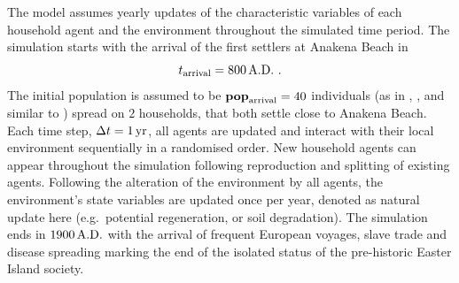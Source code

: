 The model assumes yearly updates of the characteristic variables of each household agent and the environment throughout the simulated time period.
The simulation starts with the arrival of the first settlers at Anakena Beach in
\begin{equation}
t_\text{arrival} = 800\, {\rm A.D.}\ .
\end{equation}
The initial population is assumed to be $\mathbf{pop}_{\rm arrival} = 40$ individuals (as in \citet{Good2006}, \citet{Brander1998}, and similar to \citet{Brandt2015}) spread on $2$ households, that both settle close to Anakena Beach.
Each time step, $\Delta t=1\,{\rm yr}$, all agents are updated and interact with their local environment sequentially in a randomised order. 
New household agents can appear throughout the simulation following reproduction and splitting of existing agents. 
Following the alteration of the environment by all agents, the environment's state variables are updated once per year, denoted as natural update here (e.g.\ potential regeneration, or soil degradation).
The simulation ends in $1900\, {\rm A.D.}$ with the arrival of frequent European voyages, slave trade and disease spreading marking the end of the isolated status of the pre-historic Easter Island society.%
